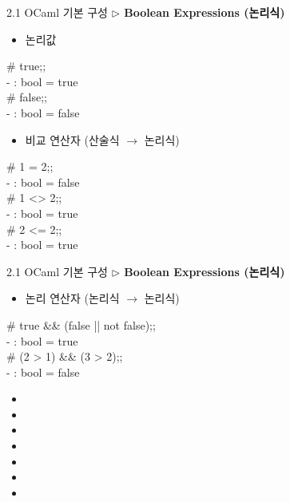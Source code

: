 \documentclass[10pt]{beamer}
\begin{document}
	\begin{frame}{2.1 OCaml 기본 구성}
		\textbf{$\triangleright$ Boolean Expressions (논리식)}
		
		\begin{itemize}
			\item 논리값
		\end{itemize}
		\begin{tcolorbox}[colback=backcolor]\ttfamily
			\# true;; \\
			- : bool = true\\
			\# false;; \\
			- : bool = false
		\end{tcolorbox}
		\begin{itemize}
			\item 비교 연산자 (산술식 $\to$ 논리식)
		\end{itemize}
		\begin{tcolorbox}[colback=backcolor]\ttfamily
			\# 1 = 2;; \\
			- : bool = false\\
			\# 1 <> 2;; \\
			- : bool = true\\
			\# 2 <= 2;; \\
			- : bool = true
		\end{tcolorbox}
	\end{frame}

	\begin{frame}{2.1 OCaml 기본 구성}
		\textbf{$\triangleright$ Boolean Expressions (논리식)}
		
		\begin{itemize}
			\item 논리 연산자 (논리식 $\to$ 논리식)
		\end{itemize}
		\begin{tcolorbox}[colback=backcolor]\ttfamily
			\# true \&\& (false || not false);; \\
			- : bool = true\\
			\# (2 > 1) \&\& (3 > 2);; \\
			- : bool = false
		\end{tcolorbox}
		\begin{itemize}
			\item[] 
			\item[] 
			\item[] 
			\item[] 
			\item[] 
			\item[] 
			\item[] 
		\end{itemize}
	\end{frame}
\end{document}
